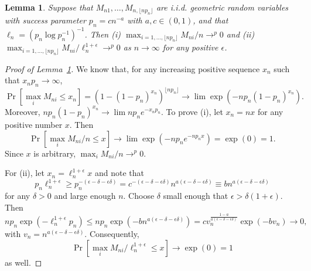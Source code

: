 \documentclass[12pt]{article}
\newtheorem{lema}{Lemma}[section]
\theoremstyle{definition}
\DeclareMathOperator{\pr}{Pr}
\begin{document}
\begin{lema}\label{res:a1}
  Suppose that $M_{n1},\dots,M_{n,\lfloor n p_n \rfloor}$ are
  i.i.d. geometric random variables with success parameter $p_n = c
  n^{-a}$ with $a, c \in (0,1)$, and that $\ell_n = (p_n \log
  p_n^{-1})^{-1}$.  Then (i) $\max_{i=1,\dots,\lfloor n p_n \rfloor}
  M_{ni} / n \to^p 0$ and (ii) $\max_{i=1,\dots,\lfloor n p_n \rfloor}
  M_{ni} / \ell_n^{1+\epsilon} \to^p 0$ as $n \to \infty$ for any
  positive $\epsilon$.
\end{lema}

\begin{proof}[Proof of Lemma~\ref{res:a1}]
  We know that, for any increasing positive sequence $x_n$ such that
  $x_n p_n \to \infty$,
  \begin{equation}
    \pr[\max_i M_{ni} \leq x_n] =
    (1 - (1 - p_n)^{x_n})^{\lfloor n p_n \rfloor} \to \lim \exp(- n p_n (1 - p_n)^{x_n}).
  \end{equation}
  Moreover, $n p_n (1 - p_n)^{x_n} \to \lim n p_n e^{-x_n p_n}$.  To
  prove (i), let $x_n = n x$ for any positive number $x$.  Then
  \begin{equation}
    \pr[\max_i M_{ni}/n \leq x ] \to \lim \exp(-n p_n e^{-n p_n x}) =
    \exp(0) = 1.
  \end{equation}
  Since $x$ is arbitrary, $\max_i M_{ni} / n \to^p 0$.

  For (ii), let $x_n = \ell_n^{1 + \epsilon} x$ and note that 
  \begin{equation}
    p_n \ell_n^{1+\epsilon} \geq p_n^{-(\epsilon-\delta-\epsilon\delta)} =
    c^{-(\epsilon-\delta-\epsilon\delta)}
    n^{a(\epsilon-\delta-\epsilon\delta)} \equiv b n^{a(\epsilon
      - \delta - \epsilon\delta)}
  \end{equation}
  for any $\delta > 0$ and large enough $n$.  Choose $\delta$ small
  enough that $\epsilon > \delta(1 +\epsilon)$. Then
  \begin{equation}
    n p_n \exp(-\ell_n^{1+\epsilon} p_n) \leq n p_n
    \exp(-b n^{a(\epsilon -
      \delta - \epsilon\delta)}) = c
    v_n^{\frac{1-a}{a(\epsilon-\delta-\epsilon\delta)}}
    \exp(-b v_n) \to 0,
  \end{equation}
  with $v_n = n^{a(\epsilon-\delta-\epsilon\delta)}$.  Consequently,
  \begin{equation}
    \pr[\max_i M_{ni}/\ell_n^{1+\epsilon} \leq x ] \to \exp(0) = 1
  \end{equation}
  as well.
\end{proof}
\end{document}
